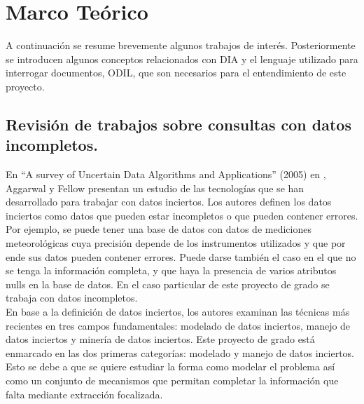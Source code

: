 \chapter{Marco Teórico} \label{chap:marcoTeorico}

A continuación se resume brevemente algunos trabajos de interés. Posteriormente se introducen algunos conceptos relacionados con DIA y el lenguaje utilizado para interrogar documentos, ODIL, que son necesarios para el entendimiento de este proyecto.


\section{Revisión de trabajos sobre consultas con datos incompletos.}

En “A survey of Uncertain Data Algorithms and Applications” (2005) en \cite{surveyUDAA}, Aggarwal  y Fellow presentan un  estudio de las tecnologías que se han desarrollado para trabajar con datos inciertos. Los autores definen los datos inciertos como datos que pueden  estar incompletos o que pueden contener errores. Por ejemplo, se puede tener una base de datos con datos de mediciones meteorológicas cuya precisión depende de los instrumentos utilizados y que por ende sus datos pueden contener errores. Puede darse también el caso en el que no se tenga la información completa, y que haya la presencia de varios atributos nulls en la base de datos. En el caso particular de este proyecto de grado se trabaja con datos incompletos. \\

En base a la definición de datos inciertos, los autores examinan las técnicas más recientes en tres campos fundamentales: modelado de datos inciertos, manejo de datos inciertos y minería de datos inciertos. Este proyecto de grado está enmarcado en las dos primeras categorías: modelado y manejo de datos inciertos. Esto se debe a que se quiere estudiar la forma como modelar el problema así como un conjunto de mecanismos que permitan completar la información que falta mediante extracción focalizada. \\

